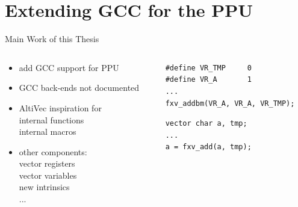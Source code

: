 \documentclass[10pt,aspectratio=169]{beamer}
\begin{document}
\section{Extending GCC for the PPU}
\begin{frame}[fragile]{Main Work of this Thesis}
    \begin{columns}[c]
    \begin{column}{0.5\textwidth}
		\begin{itemize}[<+->]
			\setlength\itemsep{1em}
            \item add GCC support for PPU
			\item GCC back-ends not documented
			\item AltiVec inspiration for\\\hspace{2em}
				internal functions\\\hspace{2em}
				internal macros
			\item other components:\\\hspace{2em}
				vector registers\\\hspace{2em}
				vector variables\\\hspace{2em}
				new intrinsics\\\hspace{2em}
					...
        \end{itemize}
    \end{column}

    \begin{column}{0.5\textwidth}
				\begin{lstlisting}[title=Previous PPU code]
#define VR_TMP     0
#define VR_A       1
...
fxv_addbm(VR_A, VR_A, VR_TMP);
				\end{lstlisting}
				\hspace*{3em}
				\begin{lstlisting}[title=New PPU code]
vector char a, tmp;
...
a = fxv_add(a, tmp);
				\end{lstlisting}
			
    \end{column}
    \end{columns}
\end{frame}
\end{document}
